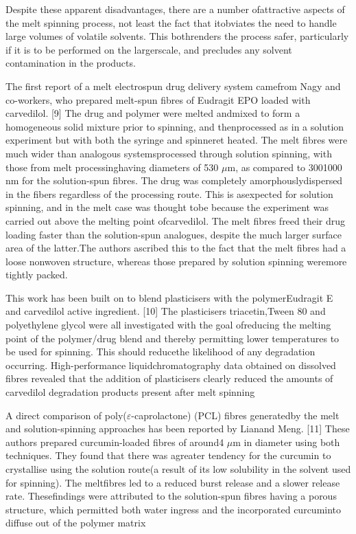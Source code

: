 \documentclass[5p,,preprint,12pt,twocolumn]{elsarticle}
\begin{document}
Despite these apparent disadvantages, there are a number ofattractive aspects of the melt spinning process, not least the fact that itobviates the need to handle large volumes of volatile solvents. This bothrenders the process safer, particularly if it is to be performed on the largerscale, and precludes any solvent contamination in the products.

The first report of a melt electrospun drug delivery system camefrom Nagy and co-workers, who prepared melt-spun fibres of Eudragit EPO loaded with carvedilol. [9] The drug and polymer were melted andmixed to form a homogeneous solid mixture prior to spinning, and thenprocessed as in a solution experiment but with both the syringe and spinneret heated. The melt fibres were much wider than analogous systemsprocessed through solution spinning, with those from melt processinghaving diameters of 5{\textendash}30 \ensuremath{\mu}m, as compared to 300{\textendash}1000 nm for the solution-spun fibres. The drug was completely amorphouslydispersed in the fibers regardless of the processing route. This is asexpected for solution spinning, and in the melt case was thought tobe because the experiment was carried out above the melting point ofcarvedilol. The melt fibres freed their drug loading faster than the solution-spun analogues, despite the much larger surface area of the latter.The authors ascribed this to the fact that the melt fibres had a loose nonwoven structure, whereas those prepared by solution spinning weremore tightly packed.

This work has been built on to blend plasticisers with the polymerEudragit E and carvedilol active ingredient. [10] The plasticisers triacetin,Tween 80 and polyethylene glycol were all investigated with the goal ofreducing the melting point of the polymer/drug blend and thereby permitting lower temperatures to be used for spinning. This should reducethe likelihood of any degradation occurring. High-performance liquidchromatography data obtained on dissolved fibres revealed that the addition of plasticisers clearly reduced the amounts of carvedilol degradation products present after melt spinning

A direct comparison of poly(\ensuremath{\varepsilon }-caprolactone) (PCL) fibres generatedby the melt and solution-spinning approaches has been reported by Lianand Meng. [11] These authors prepared curcumin-loaded fibres of around4 \ensuremath{\mu}m in diameter using both techniques. They found that there was agreater tendency for the curcumin to crystallise using the solution route(a result of its low solubility in the solvent used for spinning). The meltfibres led to a reduced burst release and a slower release rate. Thesefindings were attributed to the solution-spun fibres having a porous structure, which permitted both water ingress and the incorporated curcuminto diffuse out of the polymer matrix
\end{document}
